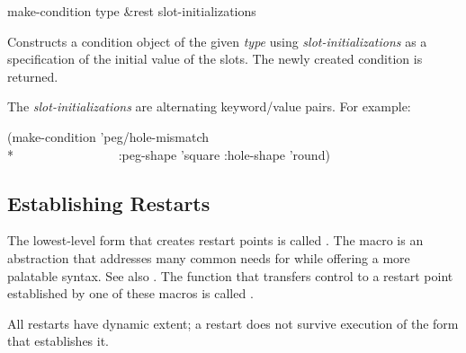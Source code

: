 \begin{defun}[Function]
make-condition type &rest slot-initializations

   Constructs a condition object of the given {\it type} using {\it slot-initializations}
   as a specification of the initial value of the slots. The newly created
   condition is returned.

   The {\it slot-initializations} are alternating keyword/value pairs.
   For example:
\begin{lisp}
(make-condition 'peg/hole-mismatch \\*
~~~~~~~~~~~~~~~~:peg-shape 'square :hole-shape 'round)
\end{lisp}
\end{defun}


\subsection{Establishing Restarts}

The lowest-level form that creates restart points is called .
The  macro is an abstraction that addresses many common needs for
 while offering a more
palatable syntax. See also 
.
The function that transfers control to a restart
point established by one of these macros is called .

All restarts have dynamic extent; a restart does not survive execution of the form
that establishes it.

